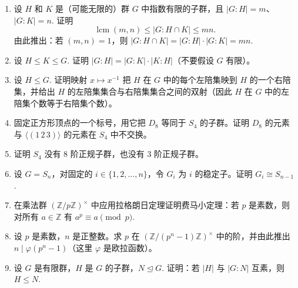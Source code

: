 \begin{enumerate}
（d）证明一个等价类只含一个元素，当且仅当它形如 \((x, x, \ldots, x)\)，其中 \(x^p = 1\).

（e）证明每个等价类的阶为 1 或 \(p\)（这里用到 \(p\) 是素数）。由此推出 \(|G|^{p-1} = k + pd\)，其中 \(k\) 是大小为 1 的类的个数，\(d\) 是大小为 \(p\) 的类的个数。

（f）由于 \(\{(1, 1, \ldots, 1)\}\) 是大小为 1 的等价类，由（e）推出 \(G\) 必存在满足 \(x^p = 1\) 的非单位元 \(x\)，即 \(G\) 含 \(p\) 阶元素。〔证明 \(p \mid k\)，从而 \(k > 1\).〕

\item 设 \(H\) 和 \(K\) 是（可能无限的）群 \(G\) 中指数有限的子群，且 \(|G : H| = m\)、\(|G : K| = n\). 证明
\[
\operatorname{lcm}(m, n) \leq |G : H \cap K| \leq mn.
\]
由此推出：若 \((m, n) = 1\)，则 \(|G : H \cap K| = |G : H| \cdot |G : K| = mn\).

\item 设 \(H \leq K \leq G\). 证明 \(|G : H| = |G : K| \cdot |K : H|\)（不要假设 \(G\) 有限）。

\item 设 \(H \leq G\). 证明映射 \(x \mapsto x^{-1}\) 把 \(H\) 在 \(G\) 中的每个左陪集映到 \(H\) 的一个右陪集，并给出 \(H\) 的左陪集集合与右陪集集合之间的双射（因此 \(H\) 在 \(G\) 中的左陪集个数等于右陪集个数）。

\item 固定正方形顶点的一个标号，用它把 \(D_8\) 等同于 \(S_4\) 的子群。证明 \(D_8\) 的元素与 \(\langle (1\,2\,3) \rangle\) 的元素在 \(S_4\) 中不交换。

\item 证明 \(S_4\) 没有 8 阶正规子群，也没有 3 阶正规子群。

\item 设 \(G = S_n\)，对固定的 \(i \in \{1, 2, \ldots, n\}\)，令 \(G_i\) 为 \(i\) 的稳定子。证明 \(G_i \cong S_{n-1}\).

\item 在乘法群 \((\mathbb{Z}/p\mathbb{Z})^\times\) 中应用拉格朗日定理证明费马小定理：若 \(p\) 是素数，则对所有 \(a \in \mathbb{Z}\) 有 \(a^p \equiv a \pmod{p}\).

\item 设 \(p\) 是素数，\(n\) 是正整数。求 \(p\) 在 \((\mathbb{Z}/(p^n - 1)\mathbb{Z})^\times\) 中的阶，并由此推出 \(n \mid \varphi(p^n - 1)\)（这里 \(\varphi\) 是欧拉函数）。

\item 设 \(G\) 是有限群，\(H\) 是 \(G\) 的子群，\(N \trianglelefteq G\). 证明：若 \(|H|\) 与 \(|G : N|\) 互素，则 \(H \leq N\).


\end{enumerate}
